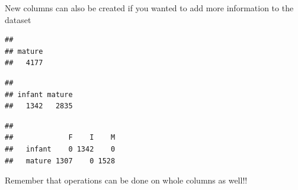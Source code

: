 \documentclass[
]{book}
\newenvironment{Shaded}{\begin{snugshade}}{\end{snugshade}}
\newcommand{\FunctionTok}[1]{\textcolor[rgb]{0.13,0.29,0.53}{\textbf{#1}}}
\newcommand{\NormalTok}[1]{#1}
\newcommand{\OtherTok}[1]{\textcolor[rgb]{0.56,0.35,0.01}{#1}}
\newcommand{\SpecialCharTok}[1]{\textcolor[rgb]{0.81,0.36,0.00}{\textbf{#1}}}
\newcommand{\StringTok}[1]{\textcolor[rgb]{0.31,0.60,0.02}{#1}}
\begin{document}
New columns can also be created if you wanted to add more information to the dataset

\begin{Shaded}
\end{Shaded}

\begin{verbatim}
## 
## mature 
##   4177
\end{verbatim}

\begin{Shaded}
\end{Shaded}

\begin{verbatim}
## 
## infant mature 
##   1342   2835
\end{verbatim}

\begin{Shaded}
\end{Shaded}

\begin{verbatim}
##         
##             F    I    M
##   infant    0 1342    0
##   mature 1307    0 1528
\end{verbatim}

Remember that operations can be done on whole columns as well!!

\begin{Shaded}
\end{Shaded}
\end{document}
